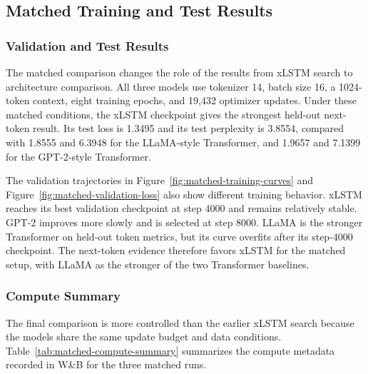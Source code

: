 \subsection{Matched Training and Test Results}

\subsubsection{Validation and Test Results}

The matched comparison changes the role of the results from xLSTM search to
architecture comparison. All three models use tokenizer 14, batch size 16, a
1024-token context, eight training epochs, and 19,432 optimizer updates. Under
these matched conditions, the xLSTM checkpoint gives the strongest held-out
next-token result. Its test loss is 1.3495 and its test perplexity is 3.8554,
compared with 1.8555 and 6.3948 for the LLaMA-style Transformer, and 1.9657 and
7.1399 for the GPT-2-style Transformer.

The validation trajectories in Figure~\ref{fig:matched-training-curves} and
Figure~\ref{fig:matched-validation-loss} also show different training behavior.
xLSTM reaches its best validation checkpoint at step 4000 and remains relatively
stable. GPT-2 improves more slowly and is selected at step 8000. LLaMA is the
stronger Transformer on held-out token metrics, but its curve overfits after its
step-4000 checkpoint. The next-token evidence therefore favors xLSTM for the
matched setup, with LLaMA as the stronger of the two Transformer baselines.

\subsubsection{Compute Summary}

The final comparison is more controlled than the earlier xLSTM search because
the models share the same update budget and data conditions. Table~\ref{tab:matched-compute-summary}
summarizes the compute metadata recorded in W\&B for the three matched runs.

